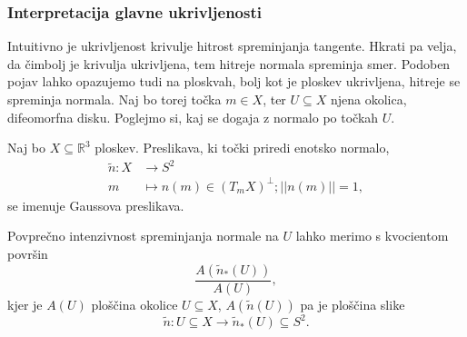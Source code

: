 \subsubsection{Interpretacija glavne ukrivljenosti}

Intuitivno je ukrivljenost krivulje hitrost spreminjanja tangente. Hkrati pa velja, da čimbolj je krivulja ukrivljena, tem hitreje
normala spreminja smer. Podoben pojav lahko opazujemo tudi na ploskvah, bolj kot je ploskev ukrivljena, hitreje se spreminja normala.
Naj bo torej točka $m \in  X$, ter $U \subseteq X$ njena okolica, difeomorfna disku. Poglejmo si, kaj se dogaja z normalo po točkah $U$.

\begin{definicija}
\label{def_gaussova_preslikava}
Naj bo $X \subseteq  \mathbb{R}^3$ ploskev. Preslikava, ki točki priredi enotsko normalo, \begin{align*}
  \tilde{n}: X &\longrightarrow S^{2} \\
  m &\longmapsto n(m) \in  (T_mX)^{\perp}; \lvert\lvert n(m) \rvert\rvert = 1,   
\end{align*}se imenuje Gaussova preslikava.
\end{definicija}

Povprečno intenzivnost spreminjanja normale na $U$ lahko merimo s kvocientom površin \begin{equation*}
\frac{A(\tilde{n}_{*}(U))}{A(U)},
\end{equation*}  
kjer je $A(U)$ ploščina okolice $U \subseteq X$, $A(\tilde{n}(U))$ pa je ploščina slike \begin{equation*}
\tilde{n}: U \subseteq X \to \tilde{n}_{*}(U) \subseteq S^2. 
\end{equation*} 

